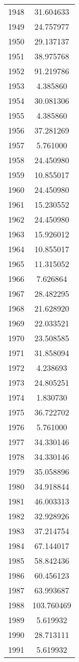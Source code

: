 \documentclass[12pt]{article}
\begin{document}
\begin{longtable}{@{}cc@{}}
1948 & 31.604633 \\
1949 & 24.757977 \\
1950 & 29.137137 \\
1951 & 38.975768 \\
1952 & 91.219786 \\
1953 & 4.385860 \\
1954 & 30.081306 \\
1955 & 4.385860 \\
1956 & 37.281269 \\
1957 & 5.761000 \\
1958 & 24.450980 \\
1959 & 10.855017 \\
1960 & 24.450980 \\
1961 & 15.230552 \\
1962 & 24.450980 \\
1963 & 15.926012 \\
1964 & 10.855017 \\
1965 & 11.315052 \\
1966 & 7.626864 \\
1967 & 28.482295 \\
1968 & 21.628920 \\
1969 & 22.033521 \\
1970 & 23.508585 \\
1971 & 31.858094 \\
1972 & 4.238693 \\
1973 & 24.805251 \\
1974 & 1.830730 \\
1975 & 36.722702 \\
1976 & 5.761000 \\
1977 & 34.330146 \\
1978 & 34.330146 \\
1979 & 35.058896 \\
1980 & 34.918844 \\
1981 & 46.003313 \\
1982 & 32.928926 \\
1983 & 37.214754 \\
1984 & 67.144017 \\
1985 & 58.842436 \\
1986 & 60.456123 \\
1987 & 63.993687 \\
1988 & 103.760469 \\
1989 & 5.619932 \\
1990 & 28.713111 \\
1991 & 5.619932 \\

\end{longtable}
\end{document}
